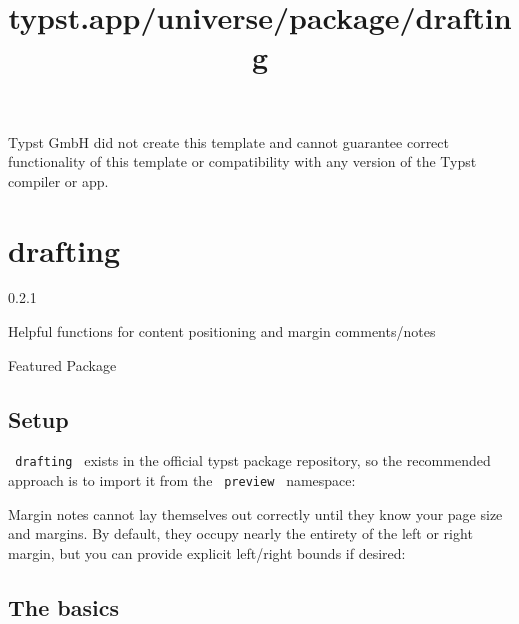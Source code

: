 Typst GmbH did not create this template and cannot guarantee correct
functionality of this template or compatibility with any version of the
Typst compiler or app.


\title{typst.app/universe/package/drafting}

\label{banner}
\section{drafting}\label{drafting}

{ 0.2.1 }

Helpful functions for content positioning and margin comments/notes

{ } Featured Package

\label{readme}
\subsection{Setup}\label{setup}

\texttt{\ drafting\ } exists in the official typst package repository,
so the recommended approach is to import it from the
\texttt{\ preview\ } namespace:

\begin{Shaded}
\begin{Highlighting}[]
\end{Highlighting}
\end{Shaded}

Margin notes cannot lay themselves out correctly until they know your
page size and margins. By default, they occupy nearly the entirety of
the left or right margin, but you can provide explicit left/right bounds
if desired:

\begin{Shaded}
\begin{Highlighting}[]
\end{Highlighting}
\end{Shaded}

\subsection{The basics}\label{the-basics}

